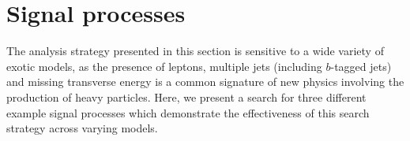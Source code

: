 \section{Signal processes}\label{sect:models}
The analysis strategy presented in this section is sensitive to a wide variety of exotic models, as the presence of leptons, multiple jets (including $b$-tagged jets) and missing transverse energy is a common signature of new physics involving the production of heavy particles.
Here, we present a search for three different example signal processes which demonstrate the effectiveness of this search strategy across varying models.

\begin{figure}[t]
\centering
{}

\end{figure}
